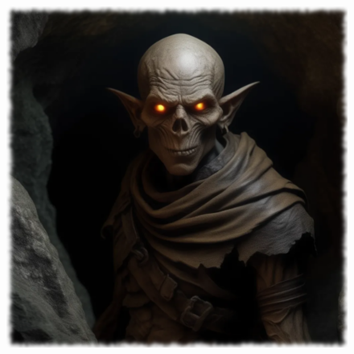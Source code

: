 \begin{figure}[H]
\begin{center}
\includegraphics[scale=0.24]{img/ai-images/ghoul.png}
\end{center}
\end{figure}
